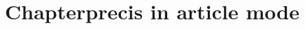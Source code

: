 \documentclass[
a4paper,
11pt,
article
]{memoir}
\makeatletter
\newcommand*\Arg@s[1]{\textnormal{\texttt{#1}}}%
\newcommand*\Arg@n[1]{\textnormal{$\langle$\textit{#1}$\rangle$}}%
\newcommand*\Arg{\@ifstar{\Arg@s}{\Arg@n}}%
\providecommand*\cs[1]{\textnormal{\texttt{\symbol{'134}#1}}}
\newenvironment{syntax}{%
  \vskip.5\onelineskip%
  \begin{adjustwidth}{\parindent}{0pt}
    \parindent=0pt%
    \obeylines%
    \let\\=\relax%
  }{%
  \end{adjustwidth}%
  \vskip.5\onelineskip%
}
\makeatother
\begin{document}




\chapter{Chapterprecis in article mode}
\label{cha:chapt-article-mode}

\end{document}
